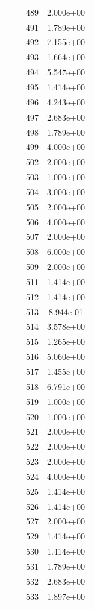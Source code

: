 \documentclass[12pt]{article}
\begin{document}
\begin{longtable}{@{}cccc@{}}
 &  & 489 & 2.000e+00 \\
 &  & 491 & 1.789e+00 \\
 &  & 492 & 7.155e+00 \\
 &  & 493 & 1.664e+00 \\
 &  & 494 & 5.547e+00 \\
 &  & 495 & 1.414e+00 \\
 &  & 496 & 4.243e+00 \\
 &  & 497 & 2.683e+00 \\
 &  & 498 & 1.789e+00 \\
 &  & 499 & 4.000e+00 \\
 &  & 502 & 2.000e+00 \\
 &  & 503 & 1.000e+00 \\
 &  & 504 & 3.000e+00 \\
 &  & 505 & 2.000e+00 \\
 &  & 506 & 4.000e+00 \\
 &  & 507 & 2.000e+00 \\
 &  & 508 & 6.000e+00 \\
 &  & 509 & 2.000e+00 \\
 &  & 511 & 1.414e+00 \\
 &  & 512 & 1.414e+00 \\
 &  & 513 & 8.944e-01 \\
 &  & 514 & 3.578e+00 \\
 &  & 515 & 1.265e+00 \\
 &  & 516 & 5.060e+00 \\
 &  & 517 & 1.455e+00 \\
 &  & 518 & 6.791e+00 \\
 &  & 519 & 1.000e+00 \\
 &  & 520 & 1.000e+00 \\
 &  & 521 & 2.000e+00 \\
 &  & 522 & 2.000e+00 \\
 &  & 523 & 2.000e+00 \\
 &  & 524 & 4.000e+00 \\
 &  & 525 & 1.414e+00 \\
 &  & 526 & 1.414e+00 \\
 &  & 527 & 2.000e+00 \\
 &  & 529 & 1.414e+00 \\
 &  & 530 & 1.414e+00 \\
 &  & 531 & 1.789e+00 \\
 &  & 532 & 2.683e+00 \\
 &  & 533 & 1.897e+00 \\

\end{longtable}
\end{document}
